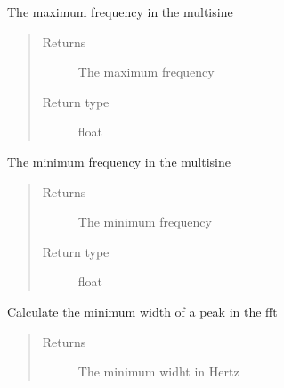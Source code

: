 \documentclass[letterpaper,10pt,english]{sphinxmanual}
\begin{document}
\begin{fulllineitems}
\begin{fulllineitems}
\end{fulllineitems}


\begin{fulllineitems}
\label{\detokenize{index:TiePieLCR_settings.TiePieLCR_settings.get_f_max}}
\sphinxAtStartPar
The maximum frequency in the multisine
\begin{quote}\begin{description}
\item[{Returns}] \leavevmode
\sphinxAtStartPar
The maximum frequency

\item[{Return type}] \leavevmode
\sphinxAtStartPar
float

\end{description}\end{quote}

\end{fulllineitems}


\begin{fulllineitems}
\label{\detokenize{index:TiePieLCR_settings.TiePieLCR_settings.get_f_min}}
\sphinxAtStartPar
The minimum frequency in the multisine
\begin{quote}\begin{description}
\item[{Returns}] \leavevmode
\sphinxAtStartPar
The minimum frequency

\item[{Return type}] \leavevmode
\sphinxAtStartPar
float

\end{description}\end{quote}

\end{fulllineitems}


\begin{fulllineitems}
\label{\detokenize{index:TiePieLCR_settings.TiePieLCR_settings.get_fft_sensitivity}}
\sphinxAtStartPar
Calculate the minimum width of a peak in the fft
\begin{quote}\begin{description}
\item[{Returns}] \leavevmode
\sphinxAtStartPar
The minimum widht in Hertz


\end{description}
\end{quote}
\end{fulllineitems}
\end{fulllineitems}
\end{document}
